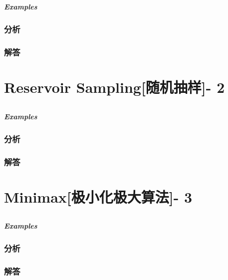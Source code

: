 \documentclass[UTF8,a4paper,12pt]{ctexbook}
\begin{document}
	\subsection{}
	
		\subparagraph{Examples}
	
		\subsubsection{分析}
	
		\subsubsection{解答}

\section{Reservoir Sampling[随机抽样]- 2}
	\subsection{}
	
		\subparagraph{Examples}
	
		\subsubsection{分析}
	
		\subsubsection{解答}
		
\section{Minimax[极小化极大算法]- 3}
	\subsection{}
	
		\subparagraph{Examples}
		
		\subsubsection{分析}
		
		\subsubsection{解答}
	\subsection{}
		
\end{document}
